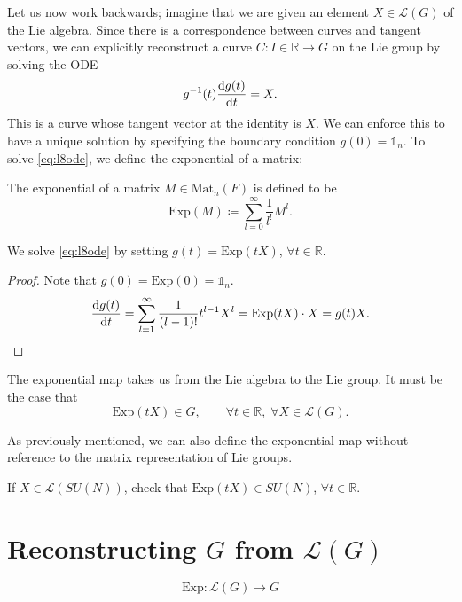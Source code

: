 \begin{wrapfigure}{L}{0.25\columnwidth}
  \centering
  \def\svgwidth{0.2\columnwidth}
  
  \caption{}
  \label{fig:l8f5}
\end{wrapfigure}
Let us now work backwards; imagine that we are given an element $X \in \mathscr{L}(G)$ of the Lie algebra.
Since there is a correspondence between curves and tangent vectors, we can explicitly reconstruct a curve $C \colon I \in \mathbb{R} \to G$ on the Lie group by solving the ODE
\begin{equation}
  \label{eq:l8ode}
  g^{-1}(t) \dv{g(t)}{t} = X.
\end{equation}
This is a curve whose tangent vector at the identity is $X$.
We can enforce this to have a unique solution by specifying the boundary condition $g(0) = \mathbb{1}_n$.
To solve \eqref{eq:l8ode}, we define the exponential of a matrix:
\begin{definition}[]
  The exponential of a matrix $M \in \text{Mat}_n(F)$ is defined to be
  \begin{equation}
    \text{Exp}(M) \coloneqq \sum_{l =0}^{\infty} \frac{1}{l^!} M^l.
  \end{equation}
\end{definition}
\begin{claim}
  We solve \eqref{eq:l8ode} by setting $g(t) = \text{Exp}(t X)$, $\forall t \in \mathbb{R}.$
\end{claim}
\begin{proof}
  Note that $g(0) = \text{Exp}(0) = \mathbb{1}_n$.
  \begin{equation}
    \dv{g(t)}{t} = \sum_{l = 1}^\infty \frac{1}{(l-1)!} t^{l-1} X^l = \text{Exp}(t X) \cdot X = g(t) X.
  \end{equation}
\end{proof}
The exponential map takes us from the Lie algebra to the Lie group.
It must be the case that
\begin{equation}
  \text{Exp}(t X) \in G, \qquad \forall t \in \mathbb{R},\; \forall X \in \mathscr{L}(G).
\end{equation}
\begin{leftbar}
  \begin{remark}
    As previously mentioned, we can also define the exponential map without reference to the matrix representation of Lie groups.
  \end{remark}
\end{leftbar}

\begin{exercise}
  If $X \in \mathscr{L}(SU(N))$, check that $\text{Exp}(t X) \in SU(N)$, $\forall t \in \mathbb{R}$.
\end{exercise}

\section{Reconstructing \texorpdfstring{$G$}{G} from \texorpdfstring{$\mathscr{L}(G)$}{its Lie Algebra}}%
\label{sec:reconstructing_g_from_l_g}

\begin{equation}
  \text{Exp}\colon \mathscr{L}(G) \to G
\end{equation}
